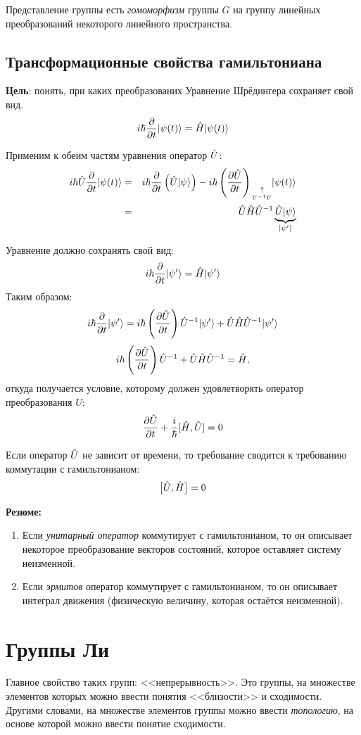 \Def Представление группы есть \emph{гомоморфизм} группы $G$ на группу линейных преобразований некоторого линейного пространства.

\subsection{Трансформационные свойства гамильтониана}
\begingroup
\textbf{Цель}: понять, при каких преобразованих Уравнение Шрёдингера сохраняет свой вид.
$$
    i \hbar \dfrac{\partial }{\partial t} | \psi(t) \rangle = \Hat H | \psi(t) \rangle
$$
\newcommand \shleft[1] {    i \hbar \ud{}{t} \qu{#1} }
\newcommand \shright[2] {     \Hat H \qu{#2} }

Применим к обеим частям уравнения оператор $\Hat U$:
\begin{eqnarray*}
    i \hbar \Hat U \dfrac{\partial }{\partial t} | \psi(t) \rangle &=& i \hbar \dfrac{\partial }{\partial t} \left( \Hat U | \psi \rangle \right)
    - i \hbar \left( \dfrac{\partial \Hat U}{\partial t} \right) \underset{\underset{\Hat U^{-1}\Hat U}{\uparrow}}{}|\psi(t)\rangle\\
    &=& \Hat U \Hat H \Hat U^{-1} \underbrace{\Hat U | \psi \rangle}_{| \psi' \rangle}
\end{eqnarray*}

Уравнение должно сохранять свой вид:
$$
    i \hbar \dfrac{\partial }{\partial t} | \psi' \rangle = \Hat H | \psi' \rangle
$$
Таким образом:
$$
    i \hbar \dfrac{\partial }{\partial t} | \psi' \rangle = i \hbar
    \left(
        \dfrac{\partial \Hat U}{\partial t}
    \right)
    \Hat U^{-1} | \psi' \rangle + \Hat U \Hat H \Hat U^{-1} | \psi' \rangle_{}
$$
$$
    i \hbar \left(
        \dfrac{\partial \Hat U}{\partial t}    
    \right) \Hat U^{-1} + \Hat U \Hat H \Hat U^{-1} = \Hat H,
$$
откуда получается условие, которому должен удовлетворять оператор преобразования $\hat U$:
$$
    \dfrac{\partial \Hat U}{\partial t} + \dfrac{i}{\hbar} [\Hat H, \Hat U] = 0
$$

Если оператор $\Hat U$ не зависит от времени, то требование сводится к требованию коммутации с гамильтонианом:
$$
    \big[ \Hat U, \Hat H \big] = 0
$$
\endgroup

\textbf{Резюме:}
\begin{enumerate}
  \item Если \emph{унитарный оператор} коммутирует с гамильтонианом, то он описывает некоторое преобразование векторов состояний, которое оставляет систему неизменной.
  \item Если \emph{эрмитов} оператор коммутирует с гамильтонианом, то он описывает интеграл движения (физическую величину, которая остаётся неизменной).
\end{enumerate}

\section{Группы Ли}
Главное свойство таких групп: <<непрерывность>>. Это группы, на множестве элементов которых можно ввести понятия <<близости>> и сходимости. Другими словами, на множестве элементов группы можно ввести \emph{топологию}, на основе которой можно ввести понятие сходимости.

